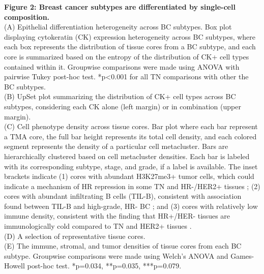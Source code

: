 \documentclass[preprint,review,3p,12pt]{elsarticle}
\begin{document}
\noindent 
\textbf{Figure 2: Breast cancer subtypes are differentiated by single-cell composition.} \\
(A) Epithelial differentiation heterogeneity across BC subtypes. Box plot displaying cytokeratin (CK) expression heterogeneity across BC subtypes, where each box represents the distribution of tissue cores from a BC subtype, and each core is summarized based on the entropy of the distribution of CK+ cell types contained within it. Groupwise comparisons were made using ANOVA with pairwise Tukey post-hoc test. *p<0.001 for all TN comparisons with other the BC subtypes.\\
(B) UpSet plot summarizing the distribution of CK+ cell types across BC subtypes, considering each CK alone (left margin) or in combination (upper margin).\\
(C) Cell phenotype density across tissue cores. Bar plot where each bar represent a TMA core, the full bar height represents its total cell density, and each colored segment represents the density of a particular cell metacluster. Bars are hierarchically clustered based on cell metacluster densities. Each bar is labeled with its corresponding subtype, stage, and grade, if a label is available. The inset brackets indicate (1) cores with abundant H3K27me3+ tumor cells, which could indicate a mechanism of HR repression in some TN and HR-/HER2+ tissues \cite{histone2016}; (2) cores with abundant infiltrating B cells (TIL-B), consistent with association found between TIL-B and high-grade, HR- BC \cite{bcell2019}; and (3) cores with relatively low immune density, consistent with the finding that HR+/HER- tissues are immunologically cold compared to TN and HER2+ tissues \cite{pdl1a2015,pdl1b2015}.\\
(D) A selection of representative tissue cores.\\
(E) The immune, stromal, and tumor densities of tissue cores from each BC subtype. Groupwise comparisons were made using Welch's ANOVA and Games-Howell post-hoc test. *p=0.034, **p=0.035, ***p=0.079.
\end{document}
